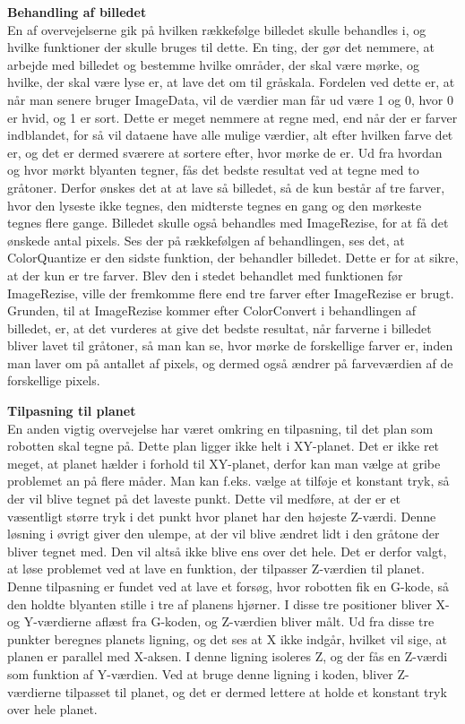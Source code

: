 \textbf{Behandling af billedet}\\
En af overvejelserne gik på hvilken rækkefølge billedet skulle behandles i, og hvilke funktioner der skulle bruges til dette. En ting, der gør det nemmere, at arbejde med billedet og bestemme hvilke områder, der skal være mørke, og hvilke, der skal være lyse er, at lave det om til gråskala. Fordelen ved dette er, at når man senere bruger ImageData, vil de værdier man får ud være 1 og 0, hvor 0 er hvid, og 1 er sort. Dette er meget nemmere at regne med, end når der er farver indblandet, for så vil dataene have alle mulige værdier, alt efter hvilken farve det er, og det er dermed sværere at sortere efter, hvor mørke de er. Ud fra hvordan og hvor mørkt blyanten tegner, fås det bedste resultat ved at tegne med to gråtoner. Derfor ønskes det at at lave så billedet, så de kun består af tre farver, hvor den lyseste ikke tegnes, den midterste tegnes en gang og den mørkeste tegnes flere gange. Billedet skulle også behandles med ImageRezise, for at få det ønskede antal pixels. Ses der på rækkefølgen af behandlingen, ses det, at ColorQuantize er den sidste funktion, der behandler billedet. Dette er for at sikre, at der kun er tre farver. Blev den i stedet behandlet med funktionen før ImageRezise, ville der fremkomme flere end tre farver efter ImageRezise er brugt. Grunden, til at ImageRezise kommer efter ColorConvert i behandlingen af billedet, er, at det vurderes at give det bedste resultat, når farverne i billedet bliver lavet til gråtoner, så man kan se, hvor mørke de forskellige farver er, inden man laver om på antallet af pixels, og dermed også ændrer på farveværdien af de forskellige pixels.

\textbf{Tilpasning til planet}\\
En anden vigtig overvejelse har været omkring en tilpasning, til det plan som robotten skal tegne på. Dette plan ligger ikke helt i XY-planet. Det er ikke ret meget, at planet hælder i forhold til XY-planet, derfor kan man vælge at gribe problemet an på flere måder. Man kan f.eks. vælge at tilføje et konstant tryk, så der vil blive tegnet på det laveste punkt. Dette vil medføre, at der er et væsentligt større tryk i det punkt hvor planet har den højeste Z-værdi. Denne løsning i øvrigt giver den ulempe, at der vil blive ændret lidt i den gråtone der bliver tegnet med. Den vil altså ikke blive ens over det hele. Det er derfor valgt, at løse problemet ved at lave en funktion, der tilpasser Z-værdien til planet. Denne tilpasning er fundet ved at lave et forsøg, hvor robotten fik en G-kode, så den holdte blyanten stille i tre af planens hjørner. I disse tre positioner bliver X- og Y-værdierne aflæst fra G-koden, og Z-værdien bliver målt. Ud fra disse tre punkter beregnes planets ligning, og det ses at X ikke indgår, hvilket vil sige, at planen er parallel med X-aksen. I denne ligning isoleres Z, og der fås en Z-værdi som funktion af Y-værdien. Ved at bruge denne ligning i koden, bliver Z-værdierne tilpasset til planet, og det er dermed lettere at holde et konstant tryk over hele planet.

